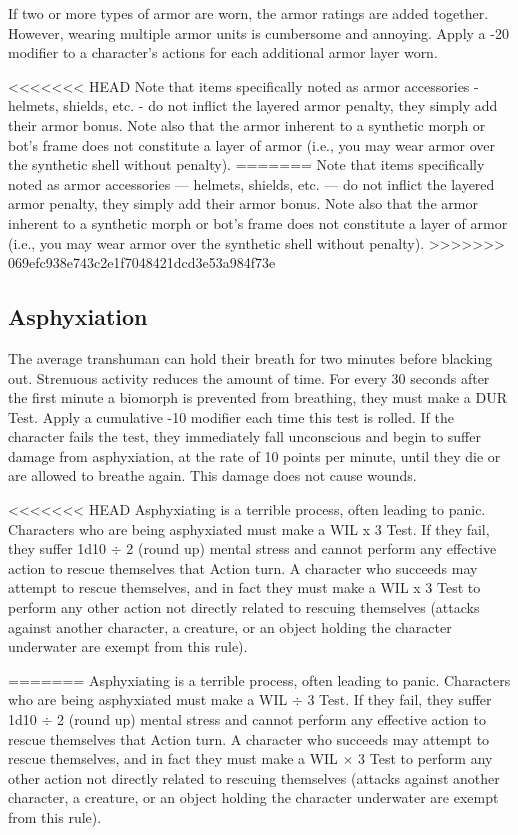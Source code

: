 If two or more types of armor are worn, the armor ratings are added together. However, wearing multiple armor units is cumbersome and annoying. Apply a -20 modifier to a character’s actions for each additional armor layer worn. 

<<<<<<< HEAD Note that items specifically noted as armor accessories - helmets, shields, etc. - do not inflict the layered armor penalty, they simply add their armor bonus. Note also that the armor inherent to a synthetic morph or bot’s frame does not constitute a layer of armor (i.e., you may wear armor over the synthetic shell without penalty). ======= Note that items specifically noted as armor accessories --- helmets, shields, etc. --- do not inflict the layered armor penalty, they simply add their armor bonus. Note also that the armor inherent to a synthetic morph or bot’s frame does not constitute a layer of armor (i.e., you may wear armor over the synthetic shell without penalty). >>>>>>> 069efc938e743c2e1f7048421dcd3e53a984f73e 



\subsection{Asphyxiation} \label{sec:asphyxiation} 

The average transhuman can hold their breath for two minutes before blacking out. Strenuous activity reduces the amount of time. For every 30 seconds after the first minute a biomorph is prevented from breathing, they must make a DUR Test. Apply a cumulative -10 modifier each time this test is rolled. If the character fails the test, they immediately fall unconscious and begin to suffer damage from asphyxiation, at the rate of 10 points per minute, until they die or are allowed to breathe again. This damage does not cause wounds. 

<<<<<<< HEAD Asphyxiating is a terrible process, often leading to panic. Characters who are being asphyxiated must make a WIL x 3 Test. If they fail, they suffer 1d10 $\div$ 2 (round up) mental stress and cannot perform any effective action to rescue themselves that Action turn. A character who succeeds may attempt to rescue themselves, and in fact they must make a WIL x 3 Test to perform any other action not directly related to rescuing themselves (attacks against another character, a creature, or an object holding the character underwater are exempt from this rule). 



 \label{sec:beam-weapons} ======= Asphyxiating is a terrible process, often leading to panic. Characters who are being asphyxiated must make a WIL $\div$ 3 Test. If they fail, they suffer 1d10 $\div$ 2 (round up) mental stress and cannot perform any effective action to rescue themselves that Action turn. A character who succeeds may attempt to rescue themselves, and in fact they must make a WIL $\times$ 3 Test to perform any other action not directly related to rescuing themselves (attacks against another character, a creature, or an object holding the character underwater are exempt from this rule). 



